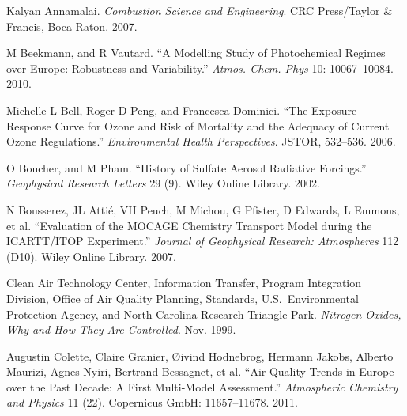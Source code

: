 \documentclass[9pt]{report}
\begin{document}
{%
\begin{thebibliography}{32}%
\label{sec-bibliography}%

Kalyan Annamalai. \emph{Combustion Science and Engineering}. CRC Press/Taylor \& Francis, Boca Raton. 2007.\label{annamalai2007combustion}%

M Beekmann, and R Vautard. \textquotedblleft{}A Modelling Study of Photochemical Regimes over Europe: Robustness and Variability.\textquotedblright{} \emph{Atmos. Chem. Phys} 10: 10067–10084. 2010.\label{beekmann2010modelling}%

Michelle L Bell, Roger D Peng, and Francesca Dominici. \textquotedblleft{}The Exposure-Response Curve for Ozone and Risk of Mortality and the Adequacy of Current Ozone Regulations.\textquotedblright{} \emph{Environmental Health Perspectives}. JSTOR, 532–536. 2006.\label{bell2006exposure}%

O Boucher, and M Pham. \textquotedblleft{}History of Sulfate Aerosol Radiative Forcings.\textquotedblright{} \emph{Geophysical Research Letters} 29 (9). Wiley Online Library. 2002.\label{boucher2002history}%

N Bousserez, JL Atti\'{e}, VH Peuch, M Michou, G Pfister, D Edwards, L Emmons, et al. \textquotedblleft{}Evaluation of the MOCAGE Chemistry Transport Model during the ICARTT/ITOP Experiment.\textquotedblright{} \emph{Journal of Geophysical Research: Atmospheres} 112 (D10). Wiley Online Library. 2007.\label{bousserez2007evaluation}%

Clean Air Technology Center, Information Transfer, Program Integration Division, Office of Air Quality Planning, Standards, U.S.~Environmental Protection Agency, and North Carolina Research Triangle Park. \emph{Nitrogen Oxides, Why and How They Are Controlled}. Nov. 1999.\label{epabulletin}%

Augustin Colette, Claire Granier, \O{}ivind Hodnebrog, Hermann Jakobs, Alberto Maurizi, Agnes Nyiri, Bertrand Bessagnet, et al. \textquotedblleft{}Air Quality Trends in Europe over the Past Decade: A First Multi-Model Assessment.\textquotedblright{} \emph{Atmospheric Chemistry and Physics} 11 (22). Copernicus GmbH: 11657–11678. 2011.\label{colette2011air}%


\end{thebibliography}}
\end{document}

